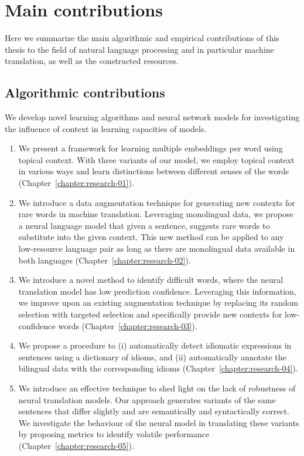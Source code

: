 
\section{Main contributions}
\label{section:introduction:contributions}

Here we summarize the main algorithmic and empirical contributions of this thesis to the field of natural language processing and in particular machine translation, as well as the constructed resources.

\subsection{Algorithmic contributions}

We develop novel learning algorithms and neural network models for investigating the influence of context in learning capacities of models. 

\begin{enumerate}
\item We present a framework for learning multiple embeddings per word using topical context.  With three variants of our model, we employ topical context in various ways and learn distinctions between different senses of the words (Chapter~\ref{chapter:research-01}).
\item We introduce a data augmentation technique for generating new contexts for rare words in machine translation. 
Leveraging monolingual data, we propose a neural language model that given a sentence, suggests rare words to substitute into the given context. 
This new method can be applied to any low-resource language pair as long as there are monolingual data available in both languages (Chapter~\ref{chapter:research-02}).
\item We introduce a novel method to identify difficult words, where the neural translation model has low prediction confidence.
Leveraging this information, we improve upon an existing augmentation technique by replacing its random selection with targeted selection and specifically provide new contexts for low-confidence words (Chapter~\ref{chapter:research-03}).
\item We propose a procedure to (i) automatically detect idiomatic expressions in sentences using a dictionary of idioms, and (ii) automatically annotate the bilingual data with the corresponding idioms (Chapter~\ref{chapter:research-04}).
\item We introduce an effective technique to shed light on the lack of robustness of neural translation models. 
Our approach generates variants of the same sentences that differ slightly and are semantically and syntactically correct. 
We investigate the behaviour of the neural model in translating these variants by proposing metrics to identify volatile performance (Chapter~\ref{chapter:research-05}).
\end{enumerate}

